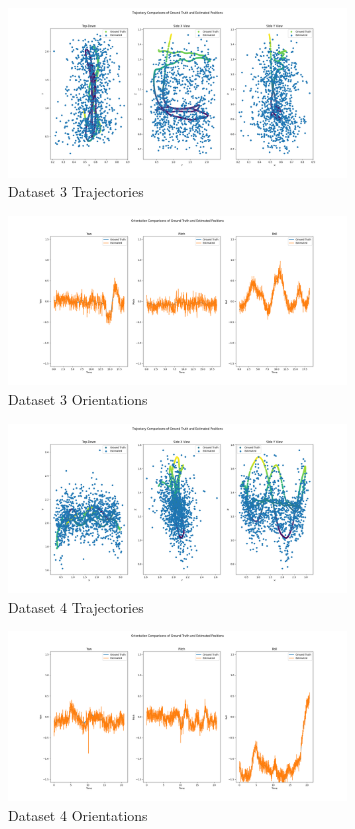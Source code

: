 \documentclass{article}
\begin{document}
\begin{figure}[H]
    \centering
    \includegraphics[width=0.8\textwidth]{./imgs/task1/studentdata3_positions.png}
    \caption{Dataset 3 Trajectories}
\end{figure}

\begin{figure}[H]
    \centering
    \includegraphics[width=0.8\textwidth]{./imgs/task1/studentdata3_orientations.png}
    \caption{Dataset 3 Orientations}
\end{figure}

\begin{figure}[H]
    \centering
    \includegraphics[width=0.8\textwidth]{./imgs/task1/studentdata4_positions.png}
    \caption{Dataset 4 Trajectories}
\end{figure}

\begin{figure}[H]
    \centering
    \includegraphics[width=0.8\textwidth]{./imgs/task1/studentdata4_orientations.png}
    \caption{Dataset 4 Orientations}
\end{figure}
\end{document}
